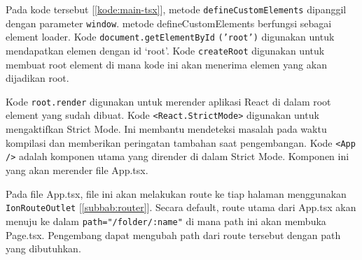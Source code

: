 Pada kode tersebut [\ref{kode:main-tsx}], metode \texttt{defineCustomElements} dipanggil dengan parameter \texttt{window}. metode defineCustomElements berfungsi sebagai element loader. Kode \texttt{document.getElementById} \texttt{('root')} digunakan untuk mendapatkan elemen dengan id `root'. Kode \texttt{createRoot} digunakan untuk membuat root element di mana kode ini akan menerima elemen yang akan dijadikan root.

Kode \texttt{root.render} digunakan untuk merender aplikasi React di dalam root element yang sudah dibuat. Kode \texttt{<React.StrictMode>} digunakan untuk mengaktifkan Strict Mode. Ini membantu mendeteksi masalah pada waktu kompilasi dan memberikan peringatan tambahan saat pengembangan. Kode \texttt{<App />} adalah komponen utama yang dirender di dalam Strict Mode. Komponen ini yang akan merender file App.tsx.

Pada file App.tsx, file ini akan melakukan route ke tiap halaman menggunakan \texttt{IonRouteOutlet} [\ref{subbab:router}]. Secara default, route utama dari App.tsx akan menuju ke dalam \texttt{path="/folder/:name"} di mana path ini akan membuka Page.tsx. Pengembang dapat mengubah path dari route tersebut dengan path yang dibutuhkan.

